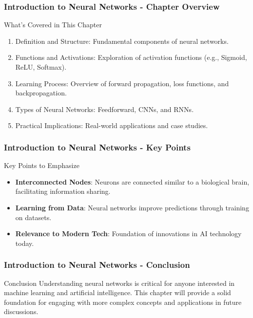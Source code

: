 \documentclass[aspectratio=169]{beamer}
\begin{document}
\begin{frame}[fragile]
    \frametitle{Introduction to Neural Networks - Chapter Overview}
    \begin{block}{What’s Covered in This Chapter}
        \begin{enumerate}
            \item Definition and Structure: Fundamental components of neural networks.
            \item Functions and Activations: Exploration of activation functions (e.g., Sigmoid, ReLU, Softmax).
            \item Learning Process: Overview of forward propagation, loss functions, and backpropagation.
            \item Types of Neural Networks: Feedforward, CNNs, and RNNs.
            \item Practical Implications: Real-world applications and case studies.
        \end{enumerate}
    \end{block}
\end{frame}

\begin{frame}[fragile]
    \frametitle{Introduction to Neural Networks - Key Points}
    \begin{block}{Key Points to Emphasize}
        \begin{itemize}
            \item \textbf{Interconnected Nodes}: Neurons are connected similar to a biological brain, facilitating information sharing.
            \item \textbf{Learning from Data}: Neural networks improve predictions through training on datasets.
            \item \textbf{Relevance to Modern Tech}: Foundation of innovations in AI technology today.
        \end{itemize}
    \end{block}
\end{frame}

\begin{frame}[fragile]
    \frametitle{Introduction to Neural Networks - Conclusion}
    \begin{block}{Conclusion}
        Understanding neural networks is critical for anyone interested in machine learning and artificial intelligence. This chapter will provide a solid foundation for engaging with more complex concepts and applications in future discussions.
    \end{block}
\end{frame}
\end{document}
